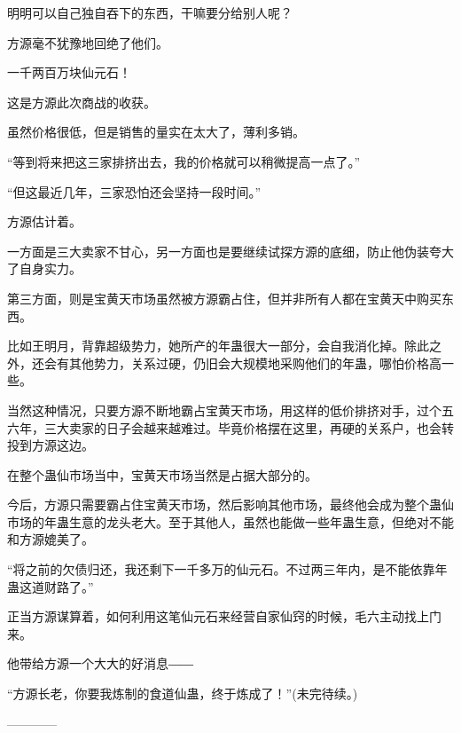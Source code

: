 \begin{this_body}
明明可以自己独自吞下的东西，干嘛要分给别人呢？

方源毫不犹豫地回绝了他们。

一千两百万块仙元石！

这是方源此次商战的收获。

虽然价格很低，但是销售的量实在太大了，薄利多销。

“等到将来把这三家排挤出去，我的价格就可以稍微提高一点了。”

“但这最近几年，三家恐怕还会坚持一段时间。”

方源估计着。

一方面是三大卖家不甘心，另一方面也是要继续试探方源的底细，防止他伪装夸大了自身实力。

第三方面，则是宝黄天市场虽然被方源霸占住，但并非所有人都在宝黄天中购买东西。

比如王明月，背靠超级势力，她所产的年蛊很大一部分，会自我消化掉。除此之外，还会有其他势力，关系过硬，仍旧会大规模地采购他们的年蛊，哪怕价格高一些。

当然这种情况，只要方源不断地霸占宝黄天市场，用这样的低价排挤对手，过个五六年，三大卖家的日子会越来越难过。毕竟价格摆在这里，再硬的关系户，也会转投到方源这边。

在整个蛊仙市场当中，宝黄天市场当然是占据大部分的。

今后，方源只需要霸占住宝黄天市场，然后影响其他市场，最终他会成为整个蛊仙市场的年蛊生意的龙头老大。至于其他人，虽然也能做一些年蛊生意，但绝对不能和方源媲美了。

“将之前的欠债归还，我还剩下一千多万的仙元石。不过两三年内，是不能依靠年蛊这道财路了。”

正当方源谋算着，如何利用这笔仙元石来经营自家仙窍的时候，毛六主动找上门来。

他带给方源一个大大的好消息――

“方源长老，你要我炼制的食道仙蛊，终于炼成了！”(未完待续。)

------------

\end{this_body}

